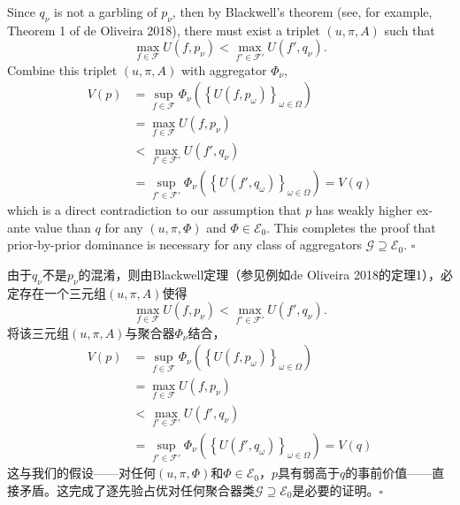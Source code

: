 \documentclass[12pt,a4paper]{article}
\newenvironment{original}
  {\par\vspace{4pt}\noindent\color{black}\ignorespaces}
  {\par\vspace{2pt}}
\newenvironment{translation}
  {\par\vspace{2pt}\noindent\color{myblue}\ignorespaces}
  {\par\vspace{6pt}}
\newcommand{\calF}{\mathcal{F}}
\newcommand{\calE}{\mathcal{E}}
\begin{document}
\begin{original}
Since $q_{\nu}$ is not a garbling of $p_{\nu}$, then by Blackwell's theorem (see, for example, Theorem 1 of de Oliveira 2018), there must exist a triplet $(u,\pi,A)$ such that
\begin{equation}
    \max_{f\in\calF} U(f, p_{\nu}) < \max_{f'\in\calF'} U(f', q_{\nu}).
\end{equation}
Combine this triplet $(u,\pi,A)$ with aggregator $\Phi_{\nu}$,
\begin{align}
    V(p) &= \sup_{f\in\calF} \Phi_{\nu}\left( \left\{ U(f, p_{\omega}) \right\}_{\omega\in\Omega} \right) \nonumber\\
         &= \max_{f\in\calF} U(f, p_{\nu}) \nonumber\\
         &< \max_{f'\in\calF'} U(f', q_{\nu}) \nonumber\\
         &= \sup_{f'\in\calF'} \Phi_{\nu}\left( \left\{ U(f', q_{\omega}) \right\}_{\omega\in\Omega} \right) = V(q)
\end{align}
which is a direct contradiction to our assumption that $p$ has weakly higher ex-ante value than $q$ for any $(u,\pi,\Phi)$ and $\Phi\in\calE_0$. This completes the proof that prior-by-prior dominance is necessary for any class of aggregators $\mathcal{G}\supseteq\calE_0$. $\square$
\end{original}

\begin{translation}
由于$q_{\nu}$不是$p_{\nu}$的混淆，则由Blackwell定理（参见例如de Oliveira 2018的定理1），必定存在一个三元组$(u,\pi,A)$使得
\begin{equation}
    \max_{f\in\calF} U(f, p_{\nu}) < \max_{f'\in\calF'} U(f', q_{\nu}).
\end{equation}
将该三元组$(u,\pi,A)$与聚合器$\Phi_{\nu}$结合，
\begin{align}
    V(p) &= \sup_{f\in\calF} \Phi_{\nu}\left( \left\{ U(f, p_{\omega}) \right\}_{\omega\in\Omega} \right) \nonumber\\
         &= \max_{f\in\calF} U(f, p_{\nu}) \nonumber\\
         &< \max_{f'\in\calF'} U(f', q_{\nu}) \nonumber\\
         &= \sup_{f'\in\calF'} \Phi_{\nu}\left( \left\{ U(f', q_{\omega}) \right\}_{\omega\in\Omega} \right) = V(q)
\end{align}
这与我们的假设——对任何$(u,\pi,\Phi)$和$\Phi\in\calE_0$，$p$具有弱高于$q$的事前价值——直接矛盾。这完成了逐先验占优对任何聚合器类$\mathcal{G}\supseteq\calE_0$是必要的证明。$\square$
\end{translation}
\end{document}
